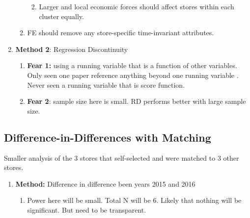 \documentclass[12pt,letterpaperpaper,]{book}
\providecommand{\tightlist}{%
  \setlength{\itemsep}{0pt}\setlength{\parskip}{0pt}}
\begin{document}
\begin{enumerate}
\begin{enumerate}
    \begin{enumerate}
    \def\labelenumiii{\arabic{enumiii}.}
    \setcounter{enumiii}{5}
    \tightlist
    \item
      Larger and local economic forces should affect stores within each
      cluster equally.
    \end{enumerate}
  \item
    FE should remove any store-specific time-invariant attributes.
  \end{enumerate}
\item
  \textbf{Method 2}: Regression Discontinuity

  \begin{enumerate}
  \def\labelenumii{\arabic{enumii}.}
  \setcounter{enumii}{3}
  \tightlist
  \item
    \textbf{Fear 1:} using a running variable that is a function of
    other variables. Only seen one paper reference anything beyond one
    running variable \citep{papay_extending_2011}. Never seen a running
    variable that is score function.
  \item
    \textbf{Fear 2}: sample size here is small. RD performs better with
    large sample size.
  \end{enumerate}
\end{enumerate}

\subsection*{Difference-in-Differences with
Matching}\label{difference-in-differences-with-matching}

Smaller analysis of the 3 stores that self-selected and were matched to
3 other stores.

\begin{enumerate}
\def\labelenumi{\arabic{enumi}.}
\setcounter{enumi}{2}
\tightlist
\item
  \textbf{Method:} Difference in difference been years 2015 and 2016

  \begin{enumerate}
  \def\labelenumii{\arabic{enumii}.}
  \setcounter{enumii}{2}
  \tightlist
  \item
    Power here will be small. Total N will be 6. Likely that nothing
    will be significant. But need to be transparent.
  \end{enumerate}
\end{enumerate}
\end{document}
